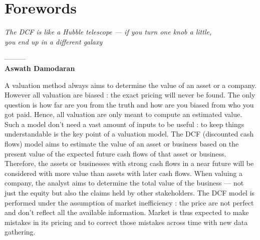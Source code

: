 









\newpage
\onehalfspacing


\newlength{\cftparagraphindent}
\setlength{\cftparagraphindent}{110pt} %
\newlength{\cftparagraphnumwidth}
\setlength{\cftparagraphnumwidth}{4.6em} %



\tableofcontents

\newpage




\chapter*{Forewords}




\begin{center}
    \textit{The DCF is like a Hubble telescope — if you turn one knob a little,\\ you end up in a different galaxy} 

    ---------\\
    \textbf{Aswath Damodaran}
\end{center}

\vfill

\lettrine{A}{} valuation method always aims to determine the value of an asset or a company. However all valuation are biased : the exact pricing will never be found. The only question is how far are you from the truth and how are you biased from who you got paid. Hence, all valuation are only meant to compute an estimated value. Such a model don't need a vast amount of inputs to be useful : to keep things understandable is the key point of a valuation model. The DCF (discounted cash flows) model aims to estimate the value of an asset or business based on the present value of the expected future cash flows of that asset or business. Therefore, the assets or businesses with strong cash flows in a near future will be considered with more value than assets with later cash flows. When valuing a company, the analyst aims to determine the total value of the business — not just the equity but also the claims held by other stakeholders. The DCF model is performed under the assumption of market inefficiency : the price are not perfect and don't reflect all the available information. Market is thus expected to make mistakes in its pricing and to correct those mistakes across time with new data gathering. 





